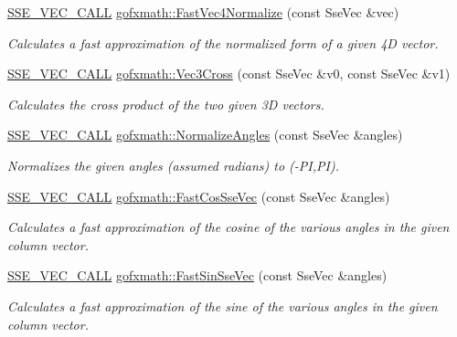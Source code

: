 \begin{DoxyCompactItemize}
\hyperlink{ssevec__math__defs_8h_a97454f977a5281455cecacce1e8ba670}{S\+S\+E\+\_\+\+V\+E\+C\+\_\+\+C\+A\+L\+L} \hyperlink{group___s_i_m_d_vec_math_ga293b1bddb59e19059c55c7e91475dc45}{gofxmath\+::\+Fast\+Vec4\+Normalize} (const Sse\+Vec \&vec)
\begin{DoxyCompactList}\small\item\em Calculates a fast approximation of the normalized form of a given 4\+D vector. \end{DoxyCompactList}\item 
\hyperlink{ssevec__math__defs_8h_a97454f977a5281455cecacce1e8ba670}{S\+S\+E\+\_\+\+V\+E\+C\+\_\+\+C\+A\+L\+L} \hyperlink{group___s_i_m_d_vec_math_ga12bda9f58865d8d62c5f6aca955bf2d2}{gofxmath\+::\+Vec3\+Cross} (const Sse\+Vec \&v0, const Sse\+Vec \&v1)
\begin{DoxyCompactList}\small\item\em Calculates the cross product of the two given 3\+D vectors. \end{DoxyCompactList}\item 
\hyperlink{ssevec__math__defs_8h_a97454f977a5281455cecacce1e8ba670}{S\+S\+E\+\_\+\+V\+E\+C\+\_\+\+C\+A\+L\+L} \hyperlink{group___s_i_m_d_vec_math_gad597eb099f2f4e22aec183c593e8facc}{gofxmath\+::\+Normalize\+Angles} (const Sse\+Vec \&angles)
\begin{DoxyCompactList}\small\item\em Normalizes the given angles (assumed radians) to (-\/\+P\+I,P\+I). \end{DoxyCompactList}\item 
\hyperlink{ssevec__math__defs_8h_a97454f977a5281455cecacce1e8ba670}{S\+S\+E\+\_\+\+V\+E\+C\+\_\+\+C\+A\+L\+L} \hyperlink{group___s_i_m_d_vec_math_ga3ef82fc17481b408f903c68e67f2c319}{gofxmath\+::\+Fast\+Cos\+Sse\+Vec} (const Sse\+Vec \&angles)
\begin{DoxyCompactList}\small\item\em Calculates a fast approximation of the cosine of the various angles in the given column vector. \end{DoxyCompactList}\item 
\hyperlink{ssevec__math__defs_8h_a97454f977a5281455cecacce1e8ba670}{S\+S\+E\+\_\+\+V\+E\+C\+\_\+\+C\+A\+L\+L} \hyperlink{group___s_i_m_d_vec_math_ga4ea85c8f8966a02e8917ad45d974244e}{gofxmath\+::\+Fast\+Sin\+Sse\+Vec} (const Sse\+Vec \&angles)
\begin{DoxyCompactList}\small\item\em Calculates a fast approximation of the sine of the various angles in the given column vector. \end{DoxyCompactList}\item 

\end{DoxyCompactItemize}
